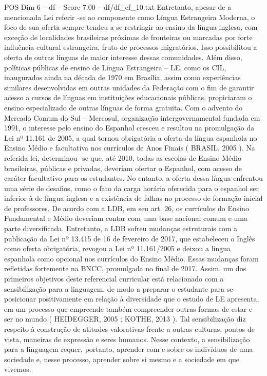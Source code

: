 \begin{textsample}{POS Dim 6 – df – Score 7.00 – df/df\_ef\_10.txt}
Entretanto, apesar de a mencionada Lei referir -se ao componente como Língua Estrangeira Moderna, o foco de sua oferta sempre tendeu a se restringir ao ensino da língua inglesa, com exceção de localidades brasileiras próximas de fronteiras ou marcadas por forte influência cultural estrangeira, fruto de processos migratórios.
Isso possibilitou a oferta de outras línguas de maior interesse dessas comunidades.
Além disso, políticas públicas de ensino de Língua Estrangeira – LE, como os CIL, inaugurados ainda na década de 1970 em Brasília, assim como experiências similares desenvolvidas em outras unidades da Federação com o fim de garantir acesso a cursos de línguas em instituições educacionais públicas, propiciaram o ensino especializado de outras línguas de forma gratuita.
Com o advento do Mercado Comum do Sul – Mercosul, organização intergovernamental fundada em 1991, o interesse pelo ensino do Espanhol cresceu e resultou na promulgação da Lei nº 11.161 de 2005, a qual tornou obrigatória a oferta da língua espanhola no Ensino Médio e facultativa nos currículos de Anos Finais ( BRASIL, 2005 ).
Na referida lei, determinou -se que, até 2010, todas as escolas de Ensino Médio brasileiras, públicas e privadas, deveriam ofertar o Espanhol, com acesso de caráter facultativo para os estudantes.
No entanto, a oferta dessa língua enfrentou uma série de desafios, como o fato da carga horária oferecida para o espanhol ser inferior à de língua inglesa e a existência de falhas no processo de formação inicial de professores.
De acordo com a LDB, em seu art. 26, os currículos do Ensino Fundamental e Médio deveriam contar com uma base nacional comum e uma parte diversificada.
Entretanto, a LDB sofreu mudanças estruturais com a publicação da Lei nº 13.415 de 16 de fevereiro de 2017, que estabeleceu o Inglês como oferta obrigatória, revogou a Lei nº 11.161/2005 e deixou a língua espanhola como opcional nos currículos do Ensino Médio.
Essas mudanças foram refletidas fortemente na BNCC, promulgada no final de 2017.
Assim, um dos primeiros objetivos deste referencial curricular está relacionado com a sensibilização para a linguagem, de modo a preparar o estudante para se posicionar positivamente em relação à diversidade que o estudo de LE apresenta, em um processo que empreende também compreender outras formas de estar e ser no mundo ( HEIDEGGER, 2005 ; KOTHE, 2013 ).
Tal sensibilização diz respeito à construção de atitudes valorativas frente a outras culturas, pontos de vista, maneiras de expressão e seres humanos.
Nesse contexto, a sensibilização para a linguagem requer, portanto, aprender com e sobre os indivíduos de uma sociedade e, nesse processo, aprender sobre si mesmo e a sociedade em que vivemos.

\end{textsample}
